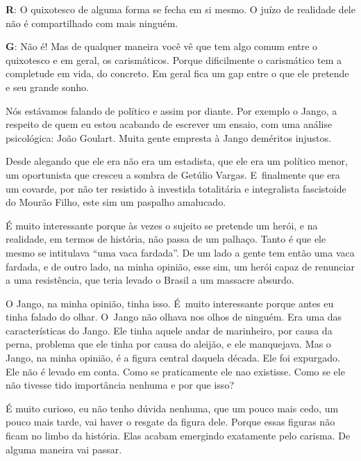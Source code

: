  

\textbf{R}: O quixotesco de alguma forma se fecha em si mesmo. O juízo de
realidade dele não é compartilhado com mais ninguém.

 

\textbf{G}: Não é! Mas de qualquer maneira você vê que tem algo comum
entre o quixotesco e em geral, os carismáticos. Porque dificilmente o
carismático tem a completude em vida, do concreto. Em geral fica um gap
entre o que ele pretende e seu grande sonho.

 

Nós estávamos falando de político e assim por diante. Por exemplo o
Jango, a respeito de quem eu estou acabando de escrever um ensaio, com
uma análise psicológica: João Goulart. Muita gente empresta à Jango
deméritos injustos.

Desde alegando que ele era não era um estadista, que ele era um político
menor, um oportunista que cresceu a sombra de Getúlio Vargas. E~finalmente que era um covarde, por não ter resistido à investida
totalitária e integralista fascistoide do Mourão Filho, este sim um
paspalho amalucado.

 

É muito interessante porque às vezes o sujeito se pretende um herói, e
na realidade, em termos de história, não passa de um palhaço. Tanto é
que ele mesmo se intitulava ``uma vaca fardada''. De um lado a gente tem
então uma vaca fardada, e de outro lado, na minha opinião, esse sim, um
herói capaz de renunciar a uma resistência, que teria levado o Brasil a
um massacre absurdo.

 

O Jango, na minha opinião, tinha isso. É~muito interessante porque antes
eu tinha falado do olhar. O~Jango não olhava nos olhos de ninguém. Era
uma das características do Jango. Ele tinha aquele andar de marinheiro,
por causa da perna, problema que ele tinha por causa do aleijão, e ele
manquejava. Mas o Jango, na minha opinião, é a figura central daquela
década. Ele foi expurgado. Ele não é levado em conta. Como se
praticamente ele nao existisse. Como se ele não tivesse tido importância
nenhuma e por que isso?

 

É muito curioso, eu não tenho dúvida nenhuma, que um pouco mais cedo, um
pouco mais tarde, vai haver o resgate da figura dele. Porque essas
figuras não ficam no limbo da história. Elas acabam emergindo exatamente
pelo carisma. De alguma maneira vai passar.

 

